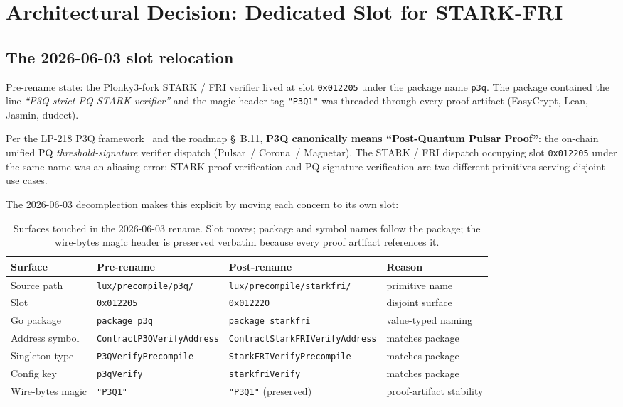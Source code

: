\section{Architectural Decision: Dedicated Slot for STARK-FRI}
\label{sec:architectural-decision}

\subsection{The 2026-06-03 slot relocation}

Pre-rename state: the Plonky3-fork STARK / FRI verifier lived at
slot \texttt{0x012205} under the package name \texttt{p3q}. The
package contained the line \emph{``P3Q strict-PQ STARK verifier''}
and the magic-header tag \texttt{"P3Q1"} was threaded through every
proof artifact (EasyCrypt, Lean, Jasmin, dudect).

Per the LP-218 P3Q framework~\cite{lp218} and the roadmap
\S~B.11, \textbf{P3Q canonically means ``Post-Quantum Pulsar
Proof''}: the on-chain unified PQ \emph{threshold-signature}
verifier dispatch (Pulsar~/ Corona~/ Magnetar). The STARK / FRI
dispatch occupying slot \texttt{0x012205} under the same name was
an aliasing error: STARK proof verification and PQ signature
verification are two different primitives serving disjoint use
cases.

The 2026-06-03 decomplection makes this explicit by moving each
concern to its own slot:

\begin{table}[h]
\centering
\small
\begin{tabular}{@{}llll@{}}
\toprule
\textbf{Surface} & \textbf{Pre-rename} & \textbf{Post-rename} & \textbf{Reason} \\
\midrule
Source path & \texttt{lux/precompile/p3q/} & \texttt{lux/precompile/starkfri/} & primitive name \\
Slot & \texttt{0x012205} & \texttt{0x012220} & disjoint surface \\
Go package & \texttt{package p3q} & \texttt{package starkfri} & value-typed naming \\
Address symbol & \texttt{ContractP3QVerifyAddress} & \texttt{ContractStarkFRIVerifyAddress} & matches package \\
Singleton type & \texttt{P3QVerifyPrecompile} & \texttt{StarkFRIVerifyPrecompile} & matches package \\
Config key & \texttt{p3qVerify} & \texttt{starkfriVerify} & matches package \\
Wire-bytes magic & \texttt{"P3Q1"} & \texttt{"P3Q1"} (preserved) & proof-artifact stability \\
\bottomrule
\end{tabular}
\caption{Surfaces touched in the 2026-06-03 rename. Slot moves;
package and symbol names follow the package; the wire-bytes magic
header is preserved verbatim because every proof artifact references
it.}
\label{tab:rename-surfaces}
\end{table}

